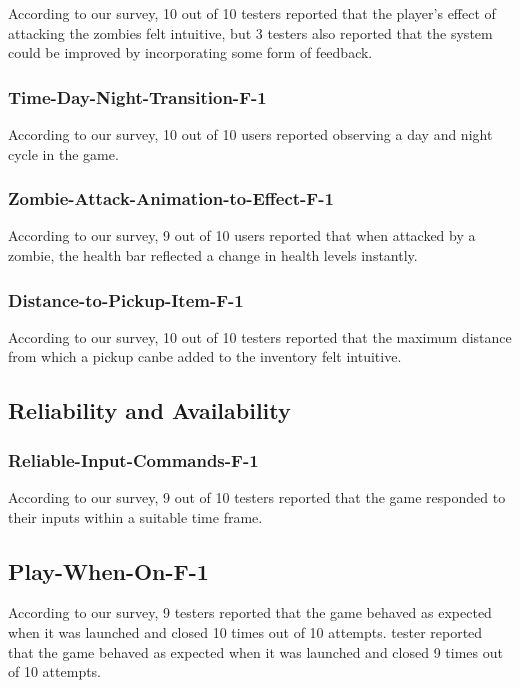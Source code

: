 \documentclass[12pt, titlepage]{article}
\begin{document}
	According to our survey, 10 out of 10 testers reported that the player's effect of attacking the zombies felt intuitive, but 3 testers also reported that the system could be improved by incorporating some form of feedback.

	
	\subsubsection{Time-Day-Night-Transition-F-1}
	
	According to our survey, 10 out of 10 users reported observing a day and night cycle in the game.
	
	\subsubsection{Zombie-Attack-Animation-to-Effect-F-1}
		According to our survey, 9 out of 10 users reported that when attacked by a zombie, the health bar reflected a change in health levels instantly.
	
	\subsubsection{Distance-to-Pickup-Item-F-1}
	
	According to our survey, 10 out of 10 testers reported that the maximum distance from which a pickup canbe added to the inventory felt intuitive.
	
\subsection{Reliability and Availability}
	\subsubsection{Reliable-Input-Commands-F-1}
	
	According to our survey, 9 out of 10 testers reported that the game responded to their inputs within a suitable time frame.
	\subsection{Play-When-On-F-1}
	
	According to our survey, 9 testers reported that the game behaved as expected when it was launched and closed 10 times out of 10 attempts. tester reported that the game behaved as expected when it was launched and closed 9 times out of 10 attempts.
\end{document}
